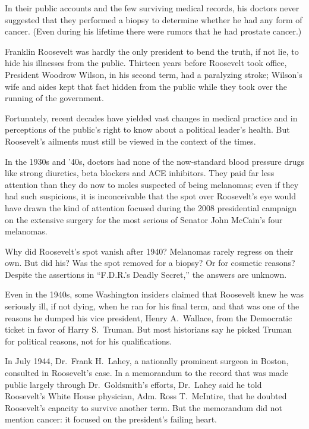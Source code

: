 ﻿\documentclass[12pt]{article}
\begin{document}
In their public accounts and the few surviving medical records, his doctors never suggested that
they performed a biopsy to determine whether he had any form of cancer. (Even during his lifetime
there were rumors that he had prostate cancer.)

Franklin Roosevelt was hardly the only president to bend the truth, if not lie, to hide his
illnesses from the public. Thirteen years before Roosevelt took office, President Woodrow Wilson, in
his second term, had a paralyzing stroke; Wilson's wife and aides kept that fact hidden from the
public while they took over the running of the government.

Fortunately, recent decades have yielded vast changes in medical practice and in perceptions of the
public's right to know about a political leader's health. But Roosevelt's ailments must still be
viewed in the context of the times.

In the 1930s and '40s, doctors had none of the now-standard blood pressure drugs like strong
diuretics, beta blockers and ACE inhibitors. They paid far less attention than they do now to moles
suspected of being melanomas; even if they had such suspicions, it is inconceivable that the spot
over Roosevelt's eye would have drawn the kind of attention focused during the 2008 presidential
campaign on the extensive surgery for the most serious of Senator John McCain's four melanomas.

Why did Roosevelt's spot vanish after 1940? Melanomas rarely regress on their own. But did his? Was
the spot removed for a biopsy? Or for cosmetic reasons? Despite the assertions in ``F.D.R.'s Deadly
Secret,'' the answers are unknown.

Even in the 1940s, some Washington insiders claimed that Roosevelt knew he was seriously ill, if not
dying, when he ran for his final term, and that was one of the reasons he dumped his vice president,
Henry A.~Wallace, from the Democratic ticket in favor of Harry S.~Truman. But most historians say he
picked Truman for political reasons, not for his qualifications.

In July 1944, Dr.~Frank H.~Lahey, a nationally prominent surgeon in Boston, consulted in Roosevelt's
case. In a memorandum to the record that was made public largely through Dr.~Goldsmith's efforts,
Dr.~Lahey said he told Roosevelt's White House physician, Adm. Ross T.~McIntire, that he doubted
Roosevelt's capacity to survive another term. But the memorandum did not mention cancer: it focused
on the president's failing heart.
\end{document}
